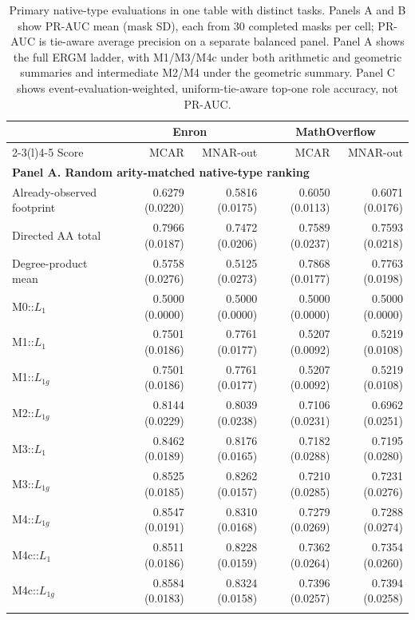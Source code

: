 \documentclass[10pt]{article}
\begin{document}
\begin{table}[!t]
\centering
\caption{Primary native-type evaluations in one table with distinct tasks. Panels A and B show PR-AUC mean (mask SD), each from 30 completed masks per cell; PR-AUC is tie-aware average precision on a separate balanced panel. Panel A shows the full ERGM ladder, with M1/M3/M4c under both arithmetic and geometric summaries and intermediate M2/M4 under the geometric summary. Panel C shows event-evaluation-weighted, uniform-tie-aware top-one role accuracy, not PR-AUC.}
\label{tab:native}
\small
\setlength{\tabcolsep}{4pt}
\begin{tabular}{@{}lrrrr@{}}
\toprule
 & \multicolumn{2}{c}{Enron} & \multicolumn{2}{c}{MathOverflow}\\
\cmidrule(lr){2-3}\cmidrule(l){4-5}
Score & MCAR & MNAR-out & MCAR & MNAR-out\\
\midrule
\multicolumn{5}{l}{\textbf{Panel A. Random arity-matched native-type ranking}}\\
Already-observed footprint & 0.6279 (0.0220) & 0.5816 (0.0175) & 0.6050 (0.0113) & 0.6071 (0.0176)\\
Directed AA total & 0.7966 (0.0187) & 0.7472 (0.0206) & 0.7589 (0.0237) & 0.7593 (0.0218)\\
Degree-product mean & 0.5758 (0.0276) & 0.5125 (0.0273) & 0.7868 (0.0177) & 0.7763 (0.0198)\\
M0::$L_1$ & 0.5000 (0.0000) & 0.5000 (0.0000) & 0.5000 (0.0000) & 0.5000 (0.0000)\\
M1::$L_1$ & 0.7501 (0.0186) & 0.7761 (0.0177) & 0.5207 (0.0092) & 0.5219 (0.0108)\\
M1::$L_{1g}$ & 0.7501 (0.0186) & 0.7761 (0.0177) & 0.5207 (0.0092) & 0.5219 (0.0108)\\
M2::$L_{1g}$ & 0.8144 (0.0229) & 0.8039 (0.0238) & 0.7106 (0.0231) & 0.6962 (0.0251)\\
M3::$L_1$ & 0.8462 (0.0189) & 0.8176 (0.0165) & 0.7182 (0.0288) & 0.7195 (0.0280)\\
M3::$L_{1g}$ & 0.8525 (0.0185) & 0.8262 (0.0157) & 0.7210 (0.0285) & 0.7231 (0.0276)\\
M4::$L_{1g}$ & 0.8547 (0.0191) & 0.8310 (0.0168) & 0.7279 (0.0269) & 0.7288 (0.0274)\\
M4c::$L_1$ & 0.8511 (0.0186) & 0.8228 (0.0159) & 0.7362 (0.0264) & 0.7354 (0.0260)\\
M4c::$L_{1g}$ & 0.8584 (0.0183) & 0.8324 (0.0158) & 0.7396 (0.0257) & 0.7394 (0.0258)\\
\addlinespace
\multicolumn{5}{l}{\textbf{Panel B. Directed hard-panel native-type ranking}}\\

\end{tabular}
\end{table}
\end{document}
